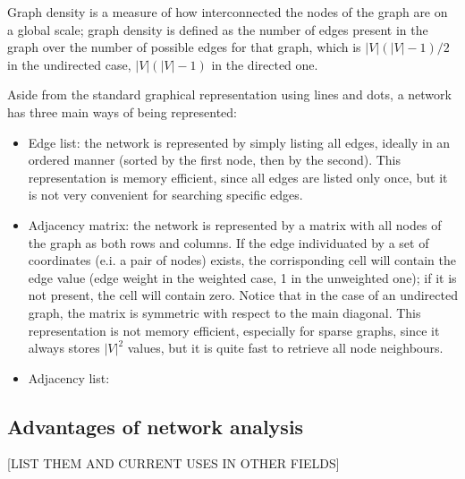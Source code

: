 Graph density is a measure of how interconnected the nodes of the graph are on a global scale; graph density is defined as the number of edges present in the graph over the number of possible edges for that graph, which is $|V|(|V|-1)/2$ in the undirected case, $|V|(|V|-1)$ in the directed one. 

Aside from the standard graphical representation using lines and dots, a network has three main ways of being represented:
\begin{itemize}\tightlist
  \item Edge list: the network is represented by simply listing all edges, ideally in an ordered manner (sorted by the first node, then by the second). This representation is memory efficient, since all edges are listed only once, but it is not very convenient for searching specific edges.
  \item Adjacency matrix: the network is represented by a matrix with all nodes of the graph as both rows and columns. If the edge individuated by a set of coordinates (e.i. a pair of nodes) exists, the corrisponding cell will contain the edge value (edge weight in the weighted case, 1 in the unweighted one); if it is not present, the cell will contain zero. Notice that in the case of an undirected graph, the matrix is symmetric with respect to the main diagonal. This representation is not memory efficient, especially for sparse graphs, since it always stores $|V|^2$ values, but it is quite fast to retrieve all node neighbours. 
  \item Adjacency list: 
\end{itemize}


\subsection{Advantages of network analysis}
[LIST THEM AND CURRENT USES IN OTHER FIELDS]

